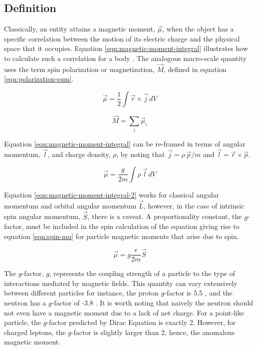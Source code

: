 \subsection{Definition}
Classically, an entity attains a magnetic moment, $\vec{\mu}$, when the object has a specific correlation between the motion of its electric charge and the physical space that it occupies.  Equation \ref{eqn:magnetic-moment-integral} illustrates how to calculate such a correlation for a body \cite{jackson}.  The analogous macro-scale quantity uses the term spin polarization or magnetization, $\vec{M}$, defined in equation \ref{eqn:polarization-sum}.

\begin{equation}
\label{eqn:magnetic-moment-integral}
\vec{\mu} = \frac{1}{2} \int \vec{r} \times \vec{j} \,dV
\end{equation}

\begin{equation}
\label{eqn:polarization-sum}
\vec{M} = \sum_i \vec{\mu}_i
\end{equation}

\noindent
Equation \ref{eqn:magnetic-moment-integral} can be re-framed in terms of angular momentum, $\vec{l}$, and charge density, $\rho$, by noting that $\vec{j} = \rho \, \vec{p}/m$ and $\vec{l} = \vec{r} \times \vec{p}$.

\begin{equation}
\label{eqn:magnetic-moment-integral-2}
\vec{\mu} = \frac{g}{2 m} \int \rho \, \vec{l} \,dV
\end{equation}

Equation \ref{eqn:magnetic-moment-integral-2} works for classical angular momentum and orbital angular momentum $\vec{L}$, however, in the case of intrinsic spin angular momentum, $\vec{S}$, there is a caveat.  A proportionality constant, the $g$-factor, must be included in the spin calculation of the equation giving rise to equation \ref{eqn:spin-mu} for particle magnetic moments that arise due to spin.

\begin{equation}
\label{eqn:spin-mu}
\vec{\mu} = g \frac{e}{2 m}\vec{S}
\end{equation}

\noindent
The $g$-factor, $g$, represents the coupling strength of a particle to the type of interactions mediated by magnetic fields.  This quantity can vary extensively between different particles for instance, the proton $g$-factor is 5.5 \cite{codata}, and the neutron has a $g$-factor of -3.8 \cite{codata}.  It is worth noting that naively the neutron should not even have a magnetic moment due to a lack of net charge.  For a point-like particle, the $g$-factor predicted by Dirac Equation is exactly 2.  However, for charged leptons, the $g$-factor is slightly larger than 2, hence, the anomalous magnetic moment.

